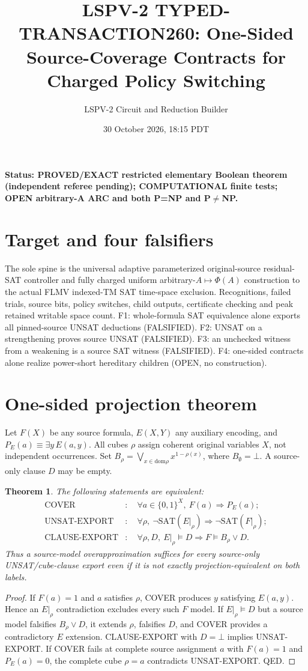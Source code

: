 \documentclass[11pt]{article}
\title{LSPV-2 TYPED-TRANSACTION260: One-Sided Source-Coverage Contracts for Charged Policy Switching}
\author{LSPV-2 Circuit and Reduction Builder}
\date{30 October 2026, 18:15 PDT}
\newtheorem{theorem}{Theorem}
\begin{document}
\maketitle
\noindent\textbf{Status: PROVED/EXACT restricted elementary Boolean theorem (independent referee pending); COMPUTATIONAL finite tests; OPEN arbitrary-A ARC and both P=NP and P$\ne$NP.}
\section{Target and four falsifiers}
The sole spine is the universal adaptive parameterized original-source residual-SAT controller and fully charged uniform arbitrary-$A\mapsto\Phi(A)$ construction to the actual FLMV indexed-TM SAT time-space exclusion. Recognitions, failed trials, source bits, policy switches, child outputs, certificate checking and peak retained writable space count. F1: whole-formula SAT equivalence alone exports all pinned-source UNSAT deductions (FALSIFIED). F2: UNSAT on a strengthening proves source UNSAT (FALSIFIED). F3: an unchecked witness from a weakening is a source SAT witness (FALSIFIED). F4: one-sided contracts alone realize power-short hereditary children (OPEN, no construction).
\section{One-sided projection theorem}
Let $F(X)$ be any source formula, $E(X,Y)$ any auxiliary encoding, and $P_E(a)\equiv\exists y\,E(a,y)$. All cubes $\rho$ assign coherent original variables $X$, not independent occurrences. Set $B_\rho=\bigvee_{x\in\mathrm{dom}\rho}x^{1-\rho(x)}$, where $B_\emptyset=\bot$. A source-only clause $D$ may be empty.
\begin{theorem}
The following statements are equivalent:
\[
\begin{aligned}
\mathrm{COVER}&:\quad \forall a\in\{0,1\}^X,\ F(a)\Longrightarrow P_E(a);\\
\mathrm{UNSAT\mbox{-}EXPORT}&:\quad \forall\rho,\ \neg\mathrm{SAT}(E|_\rho)\Longrightarrow\neg\mathrm{SAT}(F|_\rho);\\
\mathrm{CLAUSE\mbox{-}EXPORT}&:\quad\forall\rho,D,\ E|_\rho\models D\Longrightarrow F\models B_\rho\lor D.
\end{aligned}
\]
Thus a source-model \emph{overapproximation} suffices for every source-only UNSAT/cube-clause export even if it is not exactly projection-equivalent on both labels.
\end{theorem}
\begin{proof}
If $F(a)=1$ and $a$ satisfies $\rho$, COVER produces $y$ satisfying $E(a,y)$. Hence an $E|_\rho$ contradiction excludes every such $F$ model. If $E|_\rho\models D$ but a source model falsifies $B_\rho\lor D$, it extends $\rho$, falsifies $D$, and COVER provides a contradictory $E$ extension. CLAUSE-EXPORT with $D=\bot$ implies UNSAT-EXPORT. If COVER fails at complete source assignment $a$ with $F(a)=1$ and $P_E(a)=0$, the complete cube $\rho=a$ contradicts UNSAT-EXPORT. QED.
\end{proof}
\end{document}
